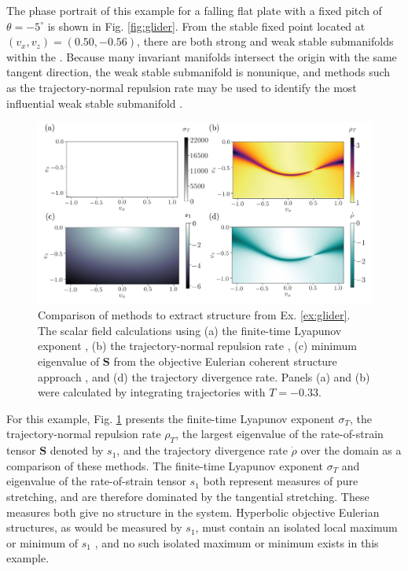 \documentclass[twocolumn]{svjour3}
\begin{document}
The phase portrait of this example for a falling flat plate with a fixed pitch of $\theta=-5^\circ$ is shown in Fig. \ref{fig:glider}. From the stable fixed point located at $(v_x,v_z)=(0.50, -0.56)$, there are both strong and weak stable submanifolds within the . Because many invariant manifolds intersect the origin with the same tangent direction, the weak stable submanifold is nonunique, and methods such as the trajectory-normal repulsion rate may be used to identify the most influential weak stable submanifold \cite{haller_variational_2011,nave2018global}.

\begin{figure}
\centering
\includegraphics[width=\linewidth]{Figures/method-comparison.png}
\caption{Comparison of methods to extract structure from Ex. \ref{ex:glider}. The scalar field calculations using (a) the finite-time Lyapunov exponent \cite{shadden2005definition}, (b) the trajectory-normal repulsion rate \cite{haller_variational_2011}, (c) minimum eigenvalue of $\mathbf{S}$ from the objective Eulerian coherent structure approach \cite{serra_objective_2016}, and (d) the trajectory divergence rate. Panels (a) and (b) were calculated by integrating trajectories with $T=-0.33$.}
\label{fig:method-comparison}
\end{figure}

For this example, Fig. \ref{fig:method-comparison} presents the finite-time Lyapunov exponent $\sigma_T$, the trajectory-normal repulsion rate $\rho_T$, the largest eigenvalue of the rate-of-strain tensor $\mathbf{S}$ denoted by $s_1$, and the trajectory divergence rate $\dot{\rho}$ over the domain as a comparison of these methods. The finite-time Lyapunov exponent $\sigma_T$ and eigenvalue of the rate-of-strain tensor $s_1$ both represent measures of pure stretching, and are therefore dominated by the tangential stretching. These measures both give no structure in the system. Hyperbolic objective Eulerian structures, as would be measured by $s_1$, must contain an isolated local maximum or minimum of $s_1$ \cite{serra_objective_2016}, and no such isolated maximum or minimum exists in this example. 
\end{document}
